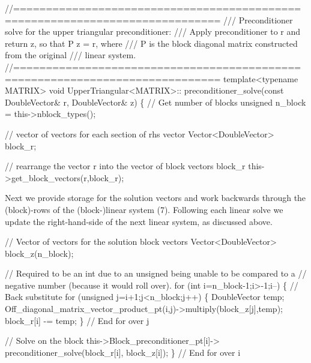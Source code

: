 \begin{DoxyCodeInclude}
 \textcolor{comment}{//=============================================================================}\textcolor{comment}{}
\textcolor{comment}{ /// Preconditioner solve for the upper triangular preconditioner: }
\textcolor{comment}{ /// Apply preconditioner to r and return z, so that P z = r, where}
\textcolor{comment}{ /// P is the block diagonal matrix constructed from the original }
\textcolor{comment}{ /// linear system.}
\textcolor{comment}{} \textcolor{comment}{//=============================================================================}
 \textcolor{keyword}{template}<\textcolor{keyword}{typename} MATRIX> \textcolor{keywordtype}{void} UpperTriangular<MATRIX>::
 preconditioner\_solve(\textcolor{keyword}{const} DoubleVector& r, DoubleVector& z)
 \{
  \textcolor{comment}{// Get number of blocks}
  \textcolor{keywordtype}{unsigned} n\_block = this->nblock\_types();

  \textcolor{comment}{// vector of vectors for each section of rhs vector}
  Vector<DoubleVector> block\_r;
  
  \textcolor{comment}{// rearrange the vector r into the vector of block vectors block\_r}
  this->get\_block\_vectors(r,block\_r);

\end{DoxyCodeInclude}


Next we provide storage for the solution vectors and work backwards through the (block)-\/rows of the (block-\/)linear system (7). Following each linear solve we update the right-\/hand-\/side of the next linear system, as discussed above.


\begin{DoxyCodeInclude}
  \textcolor{comment}{// Vector of vectors for the solution block vectors}
  Vector<DoubleVector> block\_z(n\_block);

  \textcolor{comment}{// Required to be an int due to an unsigned being unable to be compared to a}
  \textcolor{comment}{// negative number (because it would roll over).}
  \textcolor{keywordflow}{for} (\textcolor{keywordtype}{int} i=n\_block-1;i>-1;i--)
   \{
    \textcolor{comment}{// Back substitute}
    \textcolor{keywordflow}{for} (\textcolor{keywordtype}{unsigned} j=i+1;j<n\_block;j++)
     \{
      DoubleVector temp;
      Off\_diagonal\_matrix\_vector\_product\_pt(i,j)->multiply(block\_z[j],temp);
      block\_r[i] -= temp;
     \} \textcolor{comment}{// End for over j}

    \textcolor{comment}{// Solve on the block}
    this->Block\_preconditioner\_pt[i]->
     preconditioner\_solve(block\_r[i], block\_z[i]);
   \} \textcolor{comment}{// End for over i}

\end{DoxyCodeInclude}


